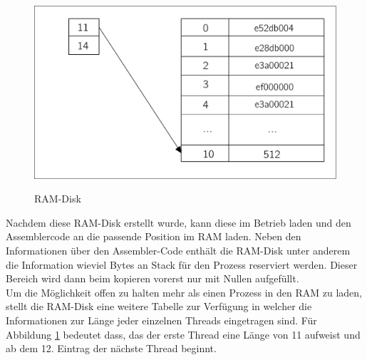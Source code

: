 \begin{figure}[H]
	\begin{center}	
	\caption{RAM-Disk}
	\includegraphics[scale=0.60]{common/ramdisk.pdf}
	\label{ramdisk}
	\end{center}
\end{figure}
\noindent
Nachdem diese RAM-Disk erstellt wurde, kann \mops diese im Betrieb laden und den Assemblercode an die passende Position im RAM laden. Neben den Informationen \"uber den Assembler-Code enth\"alt die RAM-Disk unter anderem die Information wieviel Bytes an Stack f\"ur den Prozess reserviert werden. Dieser Bereich wird dann beim kopieren vorerst nur mit Nullen aufgef\"ullt. \\
Um die M\"oglichkeit offen zu halten mehr als einen Prozess in den RAM zu laden, stellt die RAM-Disk eine weitere Tabelle zur Verf\"ugung in welcher die Informationen zur L\"ange jeder einzelnen Threads eingetragen sind. F\"ur Abbildung \ref{ramdisk} bedeutet dass, das der erste Thread eine L\"ange von 11 aufweist und ab dem 12. Eintrag der n\"achste Thread beginnt.
